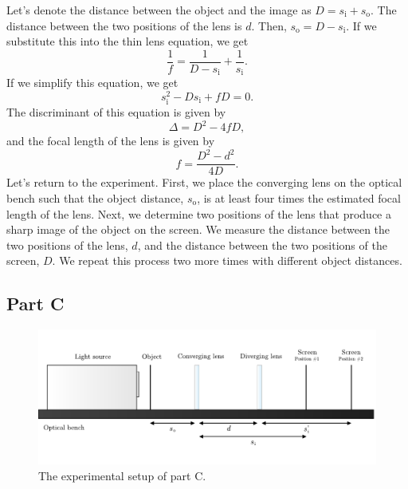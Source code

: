 \documentclass[10pt]{article}
\begin{document}
Let's denote the distance between the object and the image as $D = s_{\text{i}} + s_{\text{o}}$. The distance between the two positions of the lens is $d$. Then, $s_{\text{o}} = D - s_{\text{i}}$. If we substitute this into the thin lens equation, we get
\begin{equation}
  \dfrac{1}{f} = \dfrac{1}{D - s_{\text{i}}} + \dfrac{1}{s_{\text{i}}}.
\end{equation}
If we simplify this equation, we get
\begin{equation}
  s_{\text{i}}^2 - Ds_{\text{i}} + fD = 0.
\end{equation}
The discriminant of this equation is given by
\begin{equation}
  \Delta = D^2 - 4fD,
\end{equation}
and the focal length of the lens is given by
\begin{equation}
  f = \dfrac{D^2 - d^2}{4D}.
\end{equation}
Let's return to the experiment. First, we place the converging lens on the optical bench such that the object distance, $s_{\text{o}}$, is at least four times the estimated focal length of the lens. Next, we determine two positions of the lens that produce a sharp image of the object on the screen. We measure the distance between the two positions of the lens, $d$, and the distance between the two positions of the screen, $D$. We repeat this process two more times with different object distances.

\subsection*{Part C}

\begin{figure}[hbt!]
  \centering
  \includegraphics[scale=0.5]{figures/f6.pdf}
  \caption{The experimental setup of part C.}
  \label{fig:6}
\end{figure}
\end{document}
